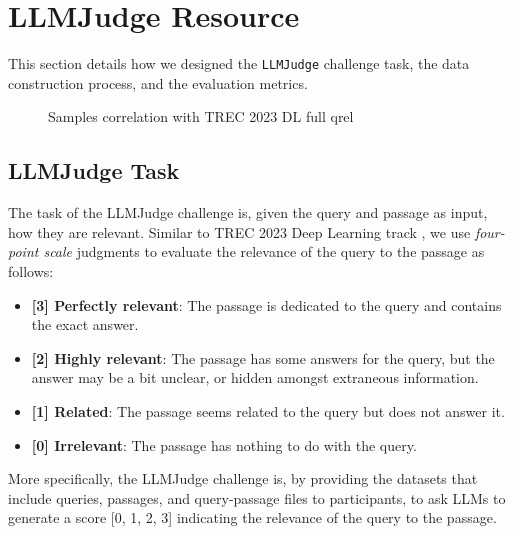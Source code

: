 \section{LLMJudge Resource}
\label{sec:llmjudge_resource}
This section details how we designed the \texttt{LLMJudge} challenge task, the data construction process, and the evaluation metrics.

\begin{figure}
    \centering
    \caption{Samples correlation with TREC 2023 DL full qrel}%
    \label{fig:data-samples}%
\end{figure}

\subsection{LLMJudge Task}
The task of the LLMJudge challenge is, given the query and passage as input, how they are relevant. Similar to TREC 2023 Deep Learning track \cite{craswell2024overview}, we use \textit{four-point scale} judgments to evaluate the relevance of the query to the passage as follows:

\begin{itemize}
    \item\textbf{[3] Perfectly relevant}: The passage is dedicated to the query and contains the exact answer. 
    \item\textbf{[2] Highly relevant}: The passage has some answers for the query, but the answer may be a bit unclear, or hidden amongst extraneous information. 
    \item\textbf{[1] Related}: The passage seems related to the query but does not answer it. 
    \item\textbf{[0] Irrelevant}: The passage has nothing to do with the query. 
\end{itemize}

More specifically, the LLMJudge challenge is, by providing the datasets that include queries, passages, and query-passage files to participants, to ask LLMs to generate a score [0, 1, 2, 3] indicating the relevance of the query to the passage.


